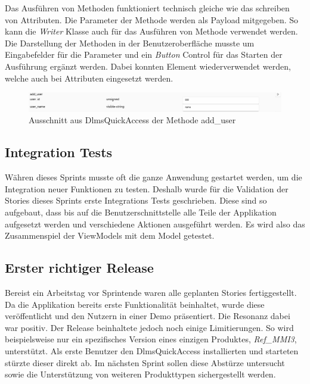 Das Ausführen von Methoden funktioniert technisch gleiche wie das schreiben von Attributen.
Die Parameter der Methode werden als Payload mitgegeben.
So kann die \textit{Writer} Klasse auch für das Ausführen von Methode verwendet werden.
Die Darstellung der Methoden in der Benutzeroberfläche musste um Eingabefelder für die Parameter und ein \textit{Button} Control für das Starten der Ausführung ergänzt werden.
Dabei konnten Element wiederverwendet werden, welche auch bei Attributen eingesetzt werden.
\begin{figure}
   \centering
   \includegraphics[width=1.0\textwidth]{gfx/addUserMethod.png}
   \caption{
      Ausschnitt aus DlmsQuickAccess der Methode add\_user
      }
      \label{fig:addUserMethod}
   \end{figure}



\subsection{Integration Tests}
Währen dieses Sprints musste oft die ganze Anwendung gestartet werden, um die Integration neuer Funktionen zu testen.
Deshalb wurde für die Validation der Stories dieses Sprints erste Integrations Tests geschrieben.
Diese sind so aufgebaut, dass bis auf die Benutzerschnittstelle alle Teile der Applikation aufgesetzt werden und verschiedene Aktionen ausgeführt werden.
Es wird also das Zusammenspiel der ViewModels mit dem Model getestet.

\subsection{Erster richtiger Release}\label{firstRelease}
Bereist ein Arbeitstag vor Sprintende waren alle geplanten Stories fertiggestellt.
Da die Applikation bereits erste Funktionalität beinhaltet, wurde diese veröffentlicht und den Nutzern in einer Demo präsentiert.
Die Resonanz dabei war positiv.
Der Release beinhaltete jedoch noch einige Limitierungen.
So wird beispielsweise nur ein spezifisches Version eines einzigen Produktes, \textit{Ref\_MMI3}, unterstützt.
Als erste Benutzer den DlmsQuickAccess installierten und starteten stürzte dieser direkt ab.
Im nächsten Sprint sollen diese Abstürze untersucht sowie die Unterstützung von weiteren Produkttypen sichergestellt werden.
